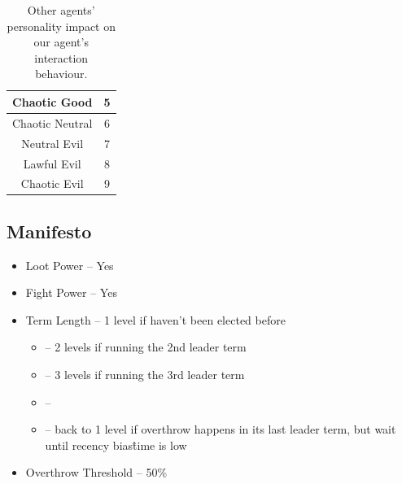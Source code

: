 \begin{table}[h!]
\begin{tabular}{ |c|p{16em}|p{16em}| }
        \hline
        Chaotic Good                      & \multicolumn{2}{c|}{5}                                                                                                                                                                                                                \\
        \hline
        Chaotic Neutral                   & \multicolumn{2}{c|}{6}                                                                                                                                                                                                                \\
        \hline
        Neutral Evil                      & \multicolumn{2}{c|}{7}                                                                                                                                                                                                                \\
        \hline
        Lawful Evil                       & \multicolumn{2}{c|}{8}                                                                                                                                                                                                                \\
        \hline
        Chaotic Evil                      & \multicolumn{2}{c|}{9}                                                                                                                                                                                                                \\
        \hline
    \end{tabular}
    \caption{Other agents' personality impact on our agent's interaction behaviour.}
    \label{table:personality_impact}
\end{table}



\subsection{Manifesto}
\begin{itemize}
\begin{itemize}
    \item Loot Power – Yes​
    \item Fight Power – Yes​
    \item Term Length –  1 level if haven't been elected before​
        \begin{itemize}
                \item –  2 levels if running the 2nd leader term​
                \item –  3 levels if running the 3rd leader term​
                \item –  \…​
                \item –  back to 1 level if overthrow happens in its last leader term, but wait until recency bias\^time is low ​
        \end{itemize}
    \item Overthrow Threshold – 50\%
\end{itemize}
\end{itemize}


